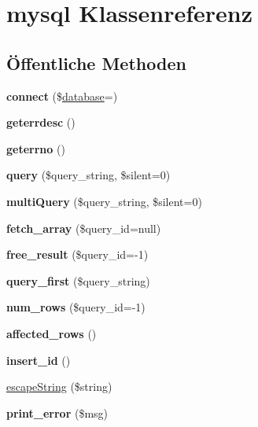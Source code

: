 \hypertarget{classmysql}{}\section{mysql Klassenreferenz}
\label{classmysql}
\subsection*{Öffentliche Methoden}
\begin{DoxyCompactItemize}
\item 
\mbox{\label{classmysql_a8954d44747c002ce5d29142183c15805}} 
{\bfseries connect} (\$\mbox{\hyperlink{classdatabase}{database}}=\textquotesingle{}\textquotesingle{})
\item 
\mbox{\label{classmysql_a454b6259a87edd5561f6833f071812ff}} 
{\bfseries geterrdesc} ()
\item 
\mbox{\label{classmysql_a49a186c3df94b35159c8ca208df42cc1}} 
{\bfseries geterrno} ()
\item 
\mbox{\label{classmysql_a1e6b6d50386cf780344a882199119d12}} 
{\bfseries query} (\$query\+\_\+string, \$silent=0)
\item 
\mbox{\label{classmysql_a69db67f287d717df0290907f4bb18f7c}} 
{\bfseries multi\+Query} (\$query\+\_\+string, \$silent=0)
\item 
\mbox{\label{classmysql_a675bb8e2e1528bd91522667c34efa80f}} 
{\bfseries fetch\+\_\+array} (\$query\+\_\+id=null)
\item 
\mbox{\label{classmysql_a7ee707b1cc72e6e743c37886dee2aa09}} 
{\bfseries free\+\_\+result} (\$query\+\_\+id=-\/1)
\item 
\mbox{\label{classmysql_a70fd5a586fa36e83ce38a7f883fecfee}} 
{\bfseries query\+\_\+first} (\$query\+\_\+string)
\item 
\mbox{\label{classmysql_a0c314150b16b0ffceef9de7ac7f243d6}} 
{\bfseries num\+\_\+rows} (\$query\+\_\+id=-\/1)
\item 
\mbox{\label{classmysql_ada561ab94eece9648d9ed2ffa17d8d7e}} 
{\bfseries affected\+\_\+rows} ()
\item 
\mbox{\label{classmysql_ab337241fed7ebaf0a733c167ef2cd881}} 
{\bfseries insert\+\_\+id} ()
\item 
\mbox{\hyperlink{classmysql_ab9e94d076a8b18c871932961f6cdd5e7}{escape\+String}} (\$string)
\item 
\mbox{\label{classmysql_abb64b7697d44acc0045666388836c111}} 
{\bfseries print\+\_\+error} (\$msg)
\end{DoxyCompactItemize}


